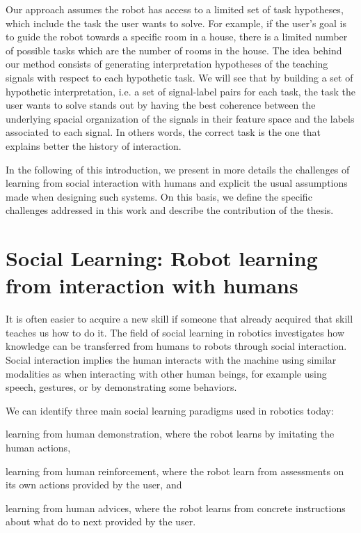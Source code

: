 Our approach assumes the robot has access to a limited set of task hypotheses, which include the task the user wants to solve. For example, if the user's goal is to guide the robot towards a specific room in a house, there is a limited number of possible tasks which are the number of rooms in the house. The idea behind our method consists of generating interpretation hypotheses of the teaching signals with respect to each hypothetic task. We will see that by building a set of hypothetic interpretation, i.e. a set of signal-label pairs for each task, the task the user wants to solve stands out by having the best coherence between the underlying spacial organization of the signals in their feature space and the labels associated to each signal. In others words, the correct task is the one that explains better the history of interaction.

In the following of this introduction, we present in more details the challenges of learning from social interaction with humans and explicit the usual assumptions made when designing such systems. On this basis, we define the specific challenges addressed in this work and describe the contribution of the thesis.

\section{Social Learning: Robot learning from interaction with humans}
\label{sec:intro:social}

It is often easier to acquire a new skill if someone that already acquired that skill teaches us how to do it. The field of social learning in robotics investigates how knowledge can be transferred from humans to robots through social interaction. Social interaction implies the human interacts with the machine using similar modalities as when interacting with other human beings, for example using speech, gestures, or by demonstrating some behaviors. 

We can identify three main social learning paradigms used in robotics today: \begin{inparaenum}[(a)] \item learning from human demonstration, where the robot learns by imitating the human actions, \item learning from human reinforcement, where the robot learn from assessments on its own actions provided by the user, and \item learning from human advices, where the robot learns from concrete instructions about what do to next provided by the user. \end{inparaenum}

